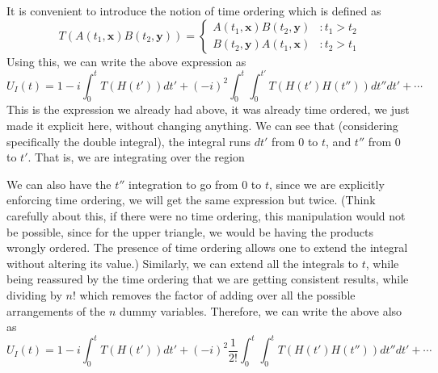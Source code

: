 \documentclass[11pt, notitlepage]{report}
\numberwithin{equation}{section}
\begin{document}
    It is convenient to introduce the notion of time ordering which is defined as 
    \begin{equation*}
        T(A(t_1, \textbf{x})B(t_2, \textbf{y})) = \begin{cases}
            A(t_1, \textbf{x})B(t_2, \textbf{y}) &: t_1 > t_2\\
            B(t_2, \textbf{y})A(t_1, \textbf{x}) &: t_2 > t_1
        \end{cases}
    \end{equation*}
    Using this, we can write the above expression as 
    \begin{equation*}
        U_I(t) = 1 - i\int_0^t T(H(t')) dt' + (-i)^2 \int_0^t \int_0^{t'} T(H(t')H(t''))dt''dt' + \cdots
    \end{equation*}
    This is the expression we already had above, it was already time ordered, we just made it explicit here, without changing anything. We can see that (considering specifically the double integral), the integral runs \(dt'\) from \(0\) to \(t\), and \(t''\) from \(0\) to \(t'\). That is, we are integrating over the region 
    \begin{figure}[h]
        \centering
    \end{figure}

    We can also have the \(t''\) integration to go from \(0\) to \(t\), since we are explicitly enforcing time ordering, we will get the same expression but twice. (Think carefully about this, if there were no time ordering, this manipulation would not be possible, since for the upper triangle, we would be having the products wrongly ordered. The presence of time ordering allows one to extend the integral without altering its value.) Similarly, we can extend all the integrals to \(t\), while being reassured by the time ordering that we are getting consistent results, while dividing by \(n!\) which removes the factor of adding over all the possible arrangements of the \(n\) dummy variables. Therefore, we can write the above also as 
    \begin{equation*}
        U_I(t) = 1 - i\int_0^t T(H(t')) dt' + (-i)^2 \frac{1}{2!}\int_0^t \int_0^t T(H(t')H(t''))dt''dt' + \cdots
    \end{equation*}
\end{document}
